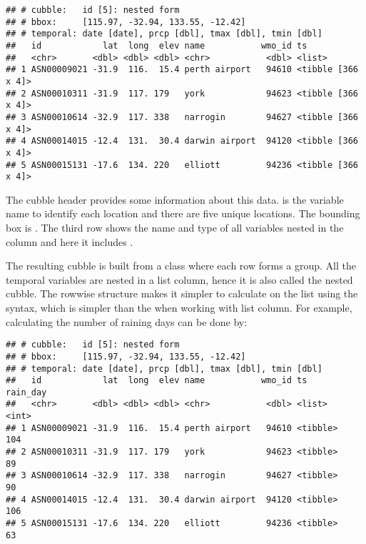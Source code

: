 \documentclass{article}
\newenvironment{Shaded}{\begin{snugshade}}{\end{snugshade}}
\newcommand{\AttributeTok}[1]{\textcolor[rgb]{0.77,0.63,0.00}{#1}}
\newcommand{\DecValTok}[1]{\textcolor[rgb]{0.00,0.00,0.81}{#1}}
\newcommand{\ErrorTok}[1]{\textcolor[rgb]{0.64,0.00,0.00}{\textbf{#1}}}
\newcommand{\FunctionTok}[1]{\textcolor[rgb]{0.00,0.00,0.00}{#1}}
\newcommand{\NormalTok}[1]{#1}
\newcommand{\SpecialCharTok}[1]{\textcolor[rgb]{0.00,0.00,0.00}{#1}}
\begin{document}
\begin{verbatim}
## # cubble:   id [5]: nested form
## # bbox:     [115.97, -32.94, 133.55, -12.42]
## # temporal: date [date], prcp [dbl], tmax [dbl], tmin [dbl]
##   id            lat  long  elev name           wmo_id ts                
##   <chr>       <dbl> <dbl> <dbl> <chr>           <dbl> <list>            
## 1 ASN00009021 -31.9  116.  15.4 perth airport   94610 <tibble [366 x 4]>
## 2 ASN00010311 -31.9  117. 179   york            94623 <tibble [366 x 4]>
## 3 ASN00010614 -32.9  117. 338   narrogin        94627 <tibble [366 x 4]>
## 4 ASN00014015 -12.4  131.  30.4 darwin airport  94120 <tibble [366 x 4]>
## 5 ASN00015131 -17.6  134. 220   elliott         94236 <tibble [366 x 4]>
\end{verbatim}

The cubble header provides some information about this data.  is the variable name to identify each location and there are five unique locations. The bounding box is \code{[115.97, -32.94, 133.55, -12.42]}. The third row shows the name and type of all variables nested in the  column and here it includes .

The resulting cubble is built from a  class where each row forms a group. All the temporal variables are nested in a list column, hence it is also called the nested cubble. The rowwise structure makes it simpler to calculate on the list using the  syntax, which is simpler than the  when working with list column. For example, calculating the number of raining days can be done by:

\begin{Shaded}
\end{Shaded}

\begin{verbatim}
## # cubble:   id [5]: nested form
## # bbox:     [115.97, -32.94, 133.55, -12.42]
## # temporal: date [date], prcp [dbl], tmax [dbl], tmin [dbl]
##   id            lat  long  elev name           wmo_id ts       rain_day
##   <chr>       <dbl> <dbl> <dbl> <chr>           <dbl> <list>      <int>
## 1 ASN00009021 -31.9  116.  15.4 perth airport   94610 <tibble>      104
## 2 ASN00010311 -31.9  117. 179   york            94623 <tibble>       89
## 3 ASN00010614 -32.9  117. 338   narrogin        94627 <tibble>       90
## 4 ASN00014015 -12.4  131.  30.4 darwin airport  94120 <tibble>      106
## 5 ASN00015131 -17.6  134. 220   elliott         94236 <tibble>       63
\end{verbatim}
\end{document}
